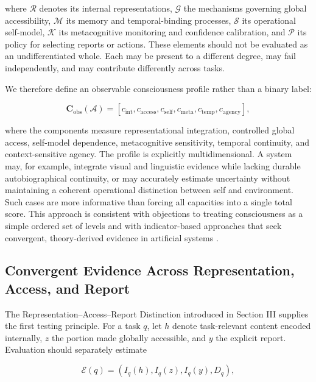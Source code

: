 where $\mathcal{R}$ denotes its internal representations, $\mathcal{G}$ the mechanisms governing global accessibility, $\mathcal{M}$ its memory and temporal-binding processes, $\mathcal{S}$ its operational self-model, $\mathcal{K}$ its metacognitive monitoring and confidence calibration, and $\mathcal{P}$ its policy for selecting reports or actions. These elements should not be evaluated as an undifferentiated whole. Each may be present to a different degree, may fail independently, and may contribute differently across tasks.

We therefore define an observable consciousness profile rather than a binary label:

\begin{equation}
\mathbf{C}_{\mathrm{obs}}(\mathcal{A})
=
\left[
c_{\mathrm{int}},
c_{\mathrm{access}},
c_{\mathrm{self}},
c_{\mathrm{meta}},
c_{\mathrm{temp}},
c_{\mathrm{agency}}
\right],
\label{eq:observable-consciousness-profile}
\end{equation}

where the components measure representational integration, controlled global access, self-model dependence, metacognitive sensitivity, temporal continuity, and context-sensitive agency. The profile is explicitly multidimensional. A system may, for example, integrate visual and linguistic evidence while lacking durable autobiographical continuity, or may accurately estimate uncertainty without maintaining a coherent operational distinction between self and environment. Such cases are more informative than forcing all capacities into a single total score. This approach is consistent with objections to treating consciousness as a simple ordered set of levels \cite{bayne2016levels} and with indicator-based approaches that seek convergent, theory-derived evidence in artificial systems \cite{butlin2023consciousness}.

\subsection{Convergent Evidence Across Representation, Access, and Report}

The Representation--Access--Report Distinction introduced in Section III supplies the first testing principle. For a task $q$, let $h$ denote task-relevant content encoded internally, $z$ the portion made globally accessible, and $y$ the explicit report. Evaluation should separately estimate

\begin{equation}
\mathcal{E}(q)
=
\left(
I_q(h),
I_q(z),
I_q(y),
D_q
\right),
\label{eq:evidence-tuple}
\end{equation}


